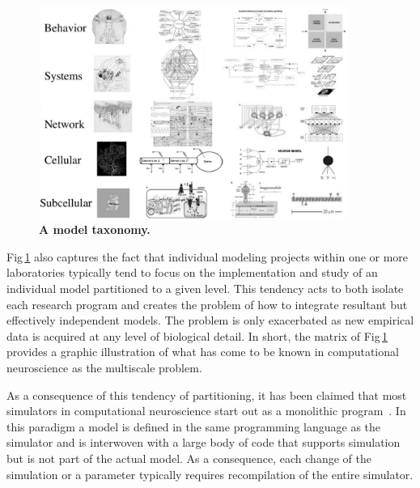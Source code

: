 \documentclass[10pt,letterpaper]{article}
\begin{document}
\begin{figure}[h!t]
  \begin{center}
    \includegraphics[width=0.9\textwidth]{figures/fig1-bw.png} %
  \end{center}
  \caption{ \small{\bf A model taxonomy.} }
  \label{fig1}
\end{figure}

Fig\,\ref{fig1} also captures the fact that individual modeling projects within one or more laboratories typically tend to focus on the implementation and study of an individual model partitioned to a given level. This tendency acts to both isolate each research program and creates the problem of how to integrate resultant but effectively independent models. The problem is only exacerbated as new empirical data is acquired at any level of biological detail. In short, the matrix of Fig\,\ref{fig1} provides a graphic illustration of what has come to be known in computational neuroscience as the multiscale problem.

As a consequence of this tendency of partitioning, it has been claimed that most simulators in computational neuroscience start out as a monolithic program~\cite{cannon07:_inter}. In this paradigm a model is defined in the same programming language as the simulator and is interwoven with a large body of code that supports simulation but is not part of the actual model. As a consequence, each change of the simulation or a parameter typically requires recompilation of the entire simulator.

\end{document}
